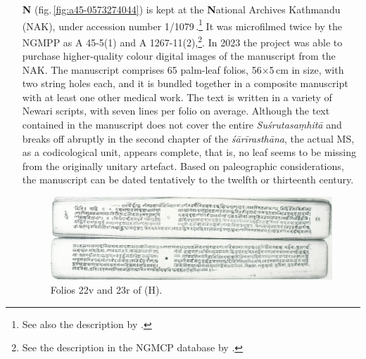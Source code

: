 \begin{itemize}
    
    \item[\textbf{N}]  
(fig.\,\ref{fig:a45-0573274044}) is kept at the \textbf{N}ational
Archives Kathmandu (NAK), under accession number
1/1079\,.\footnote{See also the description by \citet[\S
    2.2]{kleb-2021b}.}  It was microfilmed twice by the NGMPP as A 45-5(1)
    and A 1267-11(2),\footnote{See the description in the NGMCP database by
        \citet{acha-a45-5}.}.  In 2023 the project was able to purchase
        higher-quality colour digital images of the manuscript from the NAK. The
        manuscript comprises 65 palm-leaf folios, 56$\times$5\,cm in size, with
        two string holes each, and it is bundled together in a composite
        manuscript with at least one other medical work. The text is written in
        a variety of Newari scripts, with seven lines per folio on average.
        Although the text contained in the manuscript does not cover the entire
        \emph{Suśrutasaṃhitā} and breaks off abruptly in the second chapter of
        the \emph{śārīrasthāna}, the actual MS, as a codicological unit, appears
        complete, that is, no leaf seems to be missing from the originally
        unitary artefact. Based on paleographic considerations, the manuscript
        can be dated tentatively to the twelfth or thirteenth century.
    
    \begin{figure}
        \centering
        \includegraphics[draft=false,width=1\linewidth]{"media/dscn2998 fol 022cropped"}
        \caption{Folios 22v and 23r of  (H).}
        \label{fig:dscn2998-fol-022cropped}
    \end{figure}
    

\end{itemize}
